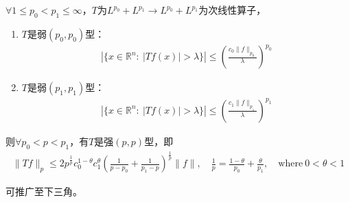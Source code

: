 \begin{theorem}
    $\forall 1\leqslant p_0 < p_1 \leqslant \infty$，$T$为$L^{p_0} + L^{p_1} \to L^{p_0} + L^{p_1}$为次线性算子，
    \begin{enumerate}[leftmargin=1cm, label=\arabic*.]
        \item $T$是弱$(p_0,p_0)$型：
        \begin{align*}
        \left| \{ x\in\mathbb{R}^n :\ |Tf(x)| > \lambda\} \right| \leqslant \left(\frac{c_0 \|f\|_{p_0}}{\lambda}\right)^{p_0}
        \end{align*}
        \item $T$是弱$(p_1, p_1)$型：
        \begin{align*}
            \left| \{ x\in\mathbb{R}^n :\ |Tf(x)| > \lambda\} \right| \leqslant \left(\frac{c_1 \|f\|_{p_1}}{\lambda}\right)^{p_1}
        \end{align*}
    \end{enumerate}
    则$\forall p_0 < p < p_1$，有$T$是强$(p,p)$型，即
    \begin{align*}
        \|Tf\|_{p} \leqslant 2 p^{\frac{1}{p}} c_0^{1-\theta} c_1^{\theta} \left( \frac{1}{p-p_0} + \frac{1}{p_1 - p} \right)^{\frac{1}{p}} \|f\|, \quad \frac{1}{p} = \frac{1-\theta}{p_0} + \frac{\theta}{p_1},\quad \text{where}\ 0<\theta<1
    \end{align*}
    
    可推广至下三角。
\end{theorem}
